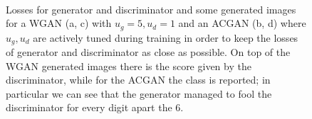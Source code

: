 \documentclass[a4paper, 11pt]{article}
\begin{document}
  \begin{figure}
    \centering
     \quad
     \\
     \quad
    \caption{Losses for generator and discriminator and some generated images for a WGAN (a, c) with $u_g = 5, u_d = 1$ and an ACGAN (b, d) where $u_g, u_d$ are actively tuned during training in order to keep the losses of generator and discriminator as close as possible. On top of the WGAN generated images there is the score given by the discriminator, while for the ACGAN the class is reported; in particular we can see that the generator managed to fool the discriminator for every digit apart the 6.}
    \label{fig:GAN}
  \end{figure}
\end{document}
